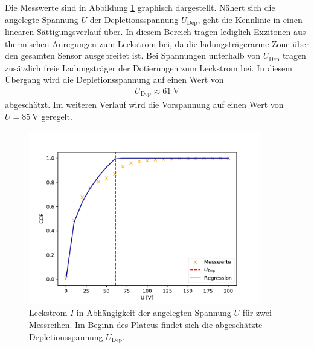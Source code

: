   Die Messwerte sind in Abbildung \ref{fig:UI-Kennlinie} graphisch dargestellt.
  Nähert sich die angelegte Spannung $U$ der Depletionsspannung $U_{\mathrm{Dep}}$, geht die Kennlinie in einen linearen Sättigungsverlauf über.
	In diesem Bereich tragen lediglich Exzitonen aus thermischen Anregungen zum Leckstrom bei, da die ladungsträgerarme Zone über den gesamten Sensor ausgebreitet ist. Bei Spannungen unterhalb von $U_{\mathrm{Dep}}$ tragen zusätzlich freie Ladungsträger der Dotierungen zum Leckstrom bei. In diesem Übergang wird die Depletionsspannung auf einen Wert von
  \begin{align*}
    U_{\mathrm{Dep}} \approx \SI{61}{\volt}
  \end{align*}
  abgeschätzt. Im weiteren Verlauf wird die Vorspannung auf einen Wert von $U=\SI{85}{\volt}$ geregelt.

\begin{figure}
  \centering
  \includegraphics[width=0.9\textwidth]{plots/Kennlinie_Laser.pdf}
  \caption{Leckstrom $I$ in Abhängigkeit der angelegten Spannung $U$ für zwei Messreihen. Im Beginn des Plateus findet sich die abgeschätzte Depletionsspannung $U_{\mathrm{Dep}}$.}
  \label{fig:UI-Kennlinie}
\end{figure}
\FloatBarrier

